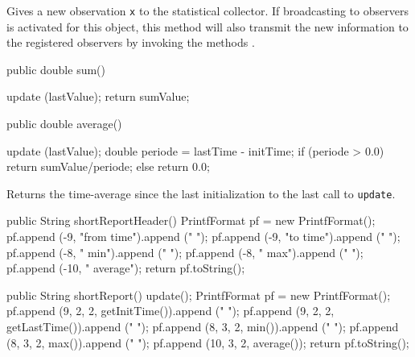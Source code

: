   \begin{tabb}  Gives a new observation \texttt{x} to the statistical collector.
   If broadcasting to observers is activated for this object,
   this method will also transmit the new information to the
   registered observers by invoking the methods
   .
 \end{tabb}
\begin{htmlonly}
\end{htmlonly}
\begin{hide}
\begin{code}

   public double sum() \begin{hide} {
      update (lastValue);
      return sumValue;
   } \end{hide}

   public double average() \begin{hide} {
      update (lastValue);
      double periode = lastTime - initTime;
      if (periode > 0.0)  return sumValue/periode;
      else  return 0.0;
   }\end{hide}
\end{code}
  \begin{tabb}  Returns the time-average since the last initialization
    to the last call to \texttt{update}.
 \end{tabb}
\begin{code}\begin{hide}
   public String shortReportHeader() {
      PrintfFormat pf = new PrintfFormat();
      pf.append (-9, "from time").append ("   ");
      pf.append (-9, "to time").append ("   ");
      pf.append (-8, "   min").append ("   ");
      pf.append (-8, "   max").append ("   ");
      pf.append (-10, " average");
      return pf.toString();
   }

   public String shortReport() {
      update();
      PrintfFormat pf = new PrintfFormat();
      pf.append (9, 2, 2, getInitTime()).append ("   ");
      pf.append (9, 2, 2, getLastTime()).append ("   ");
      pf.append (8, 3, 2, min()).append ("   ");
      pf.append (8, 3, 2, max()).append ("   ");
      pf.append (10, 3, 2, average());
      return pf.toString();
   }
\end{hide}
\end{code}
\begin{code}


\end{code}
\end{hide}
